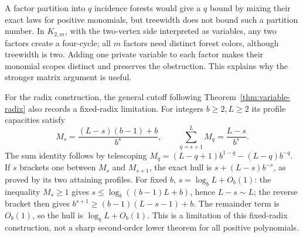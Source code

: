 A factor partition into $q$ incidence forests would give a $q$ bound
by mixing their exact laws for positive monomials, but treewidth does
not bound such a partition number. In $K_{2,m}$, with the two-vertex
side interpreted as variables, any two factors create a four-cycle;
all $m$ factors need distinct forest colors, although treewidth is two.
Adding one private variable to each factor makes their monomial scopes
distinct and preserves the obstruction. This explains why the stronger
matrix argument is useful.

For the radix construction, the general cutoff following
Theorem~\ref{thm:variable-radix} also records a fixed-radix limitation.
For integers $b\ge2,L\ge2$ its profile capacities satisfy
\[
 M_s=\frac{(L-s)(b-1)+b}{b^s},\qquad
 \sum_{q=s+1}^L M_q=\frac{L-s}{b^s}.
\]
The sum identity follows by telescoping
$M_q=(L-q+1)b^{1-q}-(L-q)b^{-q}$.
If $s$ brackets one between $M_s$ and $M_{s+1}$, the exact hull is
$s+(L-s)b^{-s}$, as proved by its two attaining profiles.
For fixed $b$, $s=\log_b L+O_b(1)$: the inequality $M_s\ge1$ gives
$s\le\log_b((b-1)L+b)$, hence $L-s\sim L$; the reverse bracket then
gives $b^{s+1}\ge(b-1)(L-s-1)+b$. The remainder term is $O_b(1)$,
so the hull is $\log_b L+O_b(1)$. This is a limitation of this
fixed-radix construction, not a sharp second-order lower theorem for
all positive polynomials.
